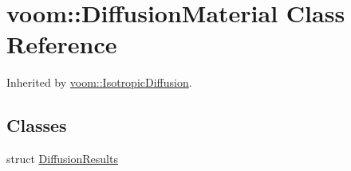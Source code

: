 \hypertarget{classvoom_1_1_diffusion_material}{
\section{voom::DiffusionMaterial Class Reference}
\label{classvoom_1_1_diffusion_material}
}


Inherited by \hyperlink{classvoom_1_1_isotropic_diffusion}{voom::IsotropicDiffusion}.\subsection*{Classes}
\begin{DoxyCompactItemize}
\item 
struct \hyperlink{structvoom_1_1_diffusion_material_1_1_diffusion_results}{DiffusionResults}
\end{DoxyCompactItemize}
